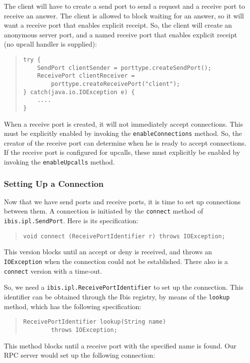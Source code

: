 \documentclass[10pt]{article}
\begin{document}
The client will have to create a send port
to send a request and a receive port to receive an answer.
The client is allowed to block waiting for an answer, so it will
want a receive port that enables explicit receipt.
So, the client will create an anonymous server port, and a named
receive port that enables explicit receipt (no upcall handler is supplied):
\begin{quote}
\begin{verbatim}
try {
    SendPort clientSender = porttype.createSendPort();
    ReceivePort clientReceiver =
        porttype.createReceivePort("client");
} catch(java.io.IOException e) {
    ....
}
\end{verbatim}
\end{quote}

When a receive port is created, it will not immediately accept connections.
This must be explicitly enabled by
invoking the \verb+enableConnections+ method. So, the creator of
the receive port can determine when he is ready to accept connections.
If the receive port is configured for upcalls, these must
explicitly be enabled by invoking the \verb+enableUpcalls+ method.

\subsubsection{Setting Up a Connection}

Now that we have send ports and receive ports, it is time to set up
connections between them.
A connection is initiated by the \verb+connect+ method of
\verb+ibis.ipl.SendPort+.
Here is its specification:

\begin{quote}
\begin{verbatim}
void connect (ReceivePortIdentifier r) throws IOException;
\end{verbatim}
\end{quote}

This version blocks until an accept or deny is received, and throws
an \verb+IOException+ when the connection could not be established.
There also is a \verb+connect+ version with a time-out.

So, we need a \verb+ibis.ipl.ReceivePortIdentifier+ to set up the
connection.
This identifier can be obtained through the Ibis registry, by
means of the \verb+lookup+ method, which has the following specification:

\begin{quote}
\begin{verbatim}
ReceivePortIdentifier lookup(String name)
        throws IOException;
\end{verbatim}
\end{quote}
\noindent
This method blocks until a receive port with the specified name is found.
Our RPC server would set up the following connection:
\end{document}
